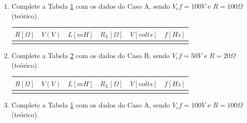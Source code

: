 \documentclass[a4paper,12pt,oneside,openany,table,xcdraw]{article}
\begin{document}
\begin{enumerate}[1 - ]
\item Complete a Tabela \ref{tab1} com os dados do Caso A, sendo $V_ef=100V$ e $R=100\Omega$ (teórico).

\begin{table}[h]
\centering
\def\arraystretch{1.35}
 \label{tab1}
\begin{tabular}{|c|c|c|l|l|l|}
\hline
$R [\Omega]$ & $V (V)$ & $L [mH]$ & $R_L [\Omega]$ & $V [volts]$ & $f [Hz]$ \\ \hline
             &         &          &                &             &          \\ \hline
\end{tabular}
\end{table}

\item Complete a Tabela \ref{tab2} com os dados do Caso B, sendo $V_ef=50V$ e $R=20\Omega$ (teórico).

\begin{table}[h]
\centering
\def\arraystretch{1.35}
 \label{tab2}
\begin{tabular}{|c|c|c|l|l|l|}
\hline
$R [\Omega]$ & $V (V)$ & $L [mH]$ & $R_L [\Omega]$ & $V [volts]$ & $f [Hz]$ \\ \hline
             &         &          &                &             &          \\ \hline
\end{tabular}
\end{table}


\item Complete a Tabela \ref{tab1} com os dados do Caso A, sendo $V_ef=100V$ e $R=100\Omega$ (teórico).


\end{enumerate}
\end{document}
